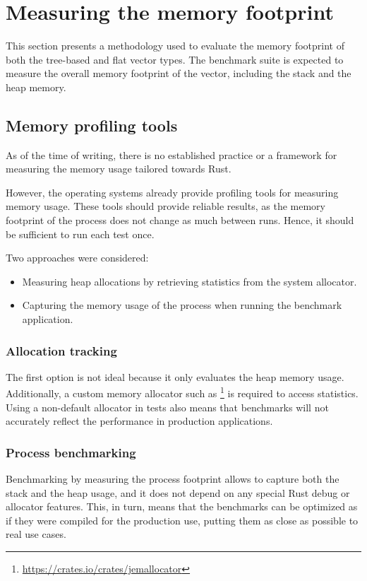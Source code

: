 \section{Measuring the memory footprint}
This section presents a methodology used to evaluate the memory footprint of both the tree-based and flat vector types. The benchmark suite is expected to measure the overall memory footprint of the vector, including the stack and the heap memory.

\subsection{Memory profiling tools}
As of the time of writing, there is no established practice or a framework for measuring the memory usage tailored towards Rust.

However, the operating systems already provide profiling tools for measuring memory usage. These tools should provide reliable results, as the memory footprint of the process does not change as much between runs. Hence, it should be sufficient to run each test once.

Two approaches were considered:
\begin{itemize}
    \item Measuring heap allocations by retrieving statistics from the system allocator.
    \item Capturing the memory usage of the process when running the benchmark application.
\end{itemize}

\subsubsection*{Allocation tracking}
The first option is not ideal because it only evaluates the heap memory usage. Additionally, a custom memory allocator such as \footnote{\url{https://crates.io/crates/jemallocator}} is required to access statistics. Using a non-default allocator in tests also means that benchmarks will not accurately reflect the performance in production applications.

\subsubsection*{Process benchmarking}
Benchmarking by measuring the process footprint allows to capture both the stack and the heap usage, and it does not depend on any special Rust debug or allocator features. This, in turn, means that the benchmarks can be optimized as if they were compiled for the production use, putting them as close as possible to real use cases.

